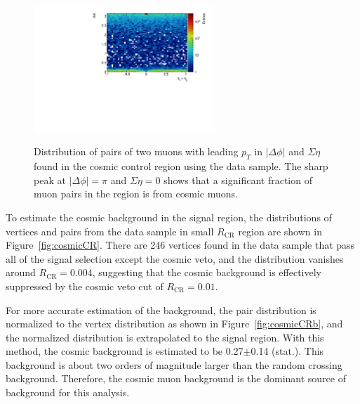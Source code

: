 \begin{figure}[!htb]
    \begin{center}
    \includegraphics[width=0.6\textwidth]{figures/Cosmics/DataValidation/mup_seta_dphi.pdf}
    \label{fig:cosmicData}
    \caption{Distribution of pairs of two muons with leading $p_{T}$ in $|\Delta \phi|$ and $\Sigma \eta$ found in the cosmic control region using the data sample. The sharp peak at $|\Delta\phi| = \pi$ and $\Sigma \eta = 0$ shows that a significant fraction of muon pairs in the region is from cosmic muons.}
\end{center}
\end{figure}

To estimate the cosmic background in the signal region, the distributions of \mumu vertices and pairs from the data sample in small $R_{\mathrm{CR}}$ region are shown in Figure~\ref{fig:cosmicCR}. There are 246 \mumu vertices found in the data sample that pass all of the signal selection except the cosmic veto, and the distribution vanishes around $R_{\mathrm{CR}}=0.004$\mumu, suggesting that the cosmic background is effectively suppressed by the cosmic veto cut of $R_{\mathrm{CR}}=0.01$.

For more accurate estimation of the background, the \mumu pair distribution is normalized to the \mumu vertex distribution as shown in Figure~\ref{fig:cosmicCRb}, and the normalized distribution is extrapolated to the signal region. With this method, the cosmic background is estimated to be 0.27$\pm$0.14 (stat.). This background is about two
orders of magnitude larger than the random crossing background. Therefore, the cosmic muon background is the dominant source of background for this analysis.


